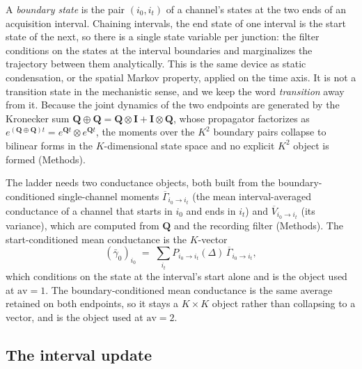 A \emph{boundary state} is the pair $(i_0, i_t)$ of a channel's states at the two ends of
an acquisition interval. Chaining intervals, the end state of one interval is the start
state of the next, so there is a single state variable per junction: the filter conditions
on the states at the interval boundaries and marginalizes the trajectory between them
analytically. This is the same device as static condensation, or the spatial Markov
property, applied on the time axis. It is not a transition state in the mechanistic sense,
and we keep the word \emph{transition} away from it. Because the joint dynamics of the two
endpoints are generated by the Kronecker sum
$\mathbf{Q}\oplus\mathbf{Q}=\mathbf{Q}\otimes\mathbf{I}+\mathbf{I}\otimes\mathbf{Q}$, whose
propagator factorizes as $e^{(\mathbf{Q}\oplus\mathbf{Q})t}=e^{\mathbf{Q}t}\otimes
e^{\mathbf{Q}t}$, the moments over the $K^2$ boundary pairs collapse to bilinear forms in
the $K$-dimensional state space and no explicit $K^2$ object is formed (Methods).

The ladder needs two conductance objects, both built from the boundary-conditioned
single-channel moments $\overline{\Gamma}_{i_0\to i_t}$ (the mean interval-averaged
conductance of a channel that starts in $i_0$ and ends in $i_t$) and
$\overline{V}_{i_0\to i_t}$ (its variance), which are computed from $\mathbf{Q}$ and the
recording filter (Methods). The start-conditioned mean conductance is the $K$-vector
\begin{equation}
  (\bar{\gamma}_0)_{i_0} \;=\; \sum_{i_t} P_{i_0\to i_t}(\Delta)\,\overline{\Gamma}_{i_0\to i_t},
  \label{eq:gammabar}
\end{equation}
which conditions on the state at the interval's start alone and is the object used at
$\mathrm{av}=1$. The boundary-conditioned mean conductance is the same average retained on
both endpoints, so it stays a $K\times K$ object rather than collapsing to a vector, and is
the object used at $\mathrm{av}=2$.

\subsection*{The interval update}

